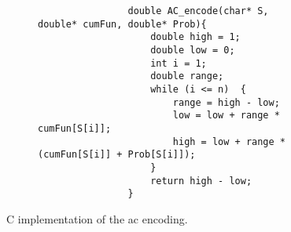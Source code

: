 \documentclass{subfiles}
\begin{document}
    \begin{figure}[!h]
        \centering
        \begin{subfigure}{0.75\textwidth}
            \begin{lstlisting}
                double AC_encode(char* S, double* cumFun, double* Prob){
                    double high = 1;
                    double low = 0;
                    int i = 1;
                    double range;
                    while (i <= n)  {
                        range = high - low;
                        low = low + range * cumFun[S[i]];
                        high = low + range * (cumFun[S[i]] + Prob[S[i]]);
                    }
                    return high - low;
                }
            \end{lstlisting}
        \end{subfigure}
        \caption{C implementation of the \gls{ac} encoding.}
        \label{Fig:4}
    \end{figure}
\end{document}
